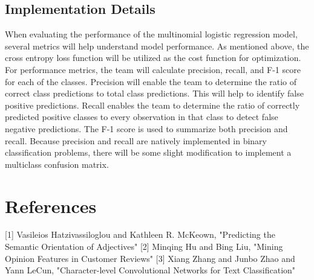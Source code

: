 \documentclass[conference]{IEEEtran}
\begin{document}
\subsection{Implementation Details}
When evaluating the performance of the multinomial logistic regression model, several metrics will help understand model performance. As mentioned above, the cross entropy loss function will be utilized as the cost function for optimization. For performance metrics, the team will calculate precision, recall, and F-1 score for each of the classes. Precision will enable the team to determine the ratio of correct class predictions to total class predictions. This will help to identify false positive predictions. Recall enables the team to determine the ratio of correctly predicted positive classes to every observation in that class to detect false negative predictions. The F-1 score is used to summarize both precision and recall. Because precision and recall are natively implemented in binary classification problems, there will be some slight modification to implement a multiclass confusion matrix. \\

\section{References}

[1] Vasileios Hatzivassiloglou and Kathleen R. McKeown, "Predicting the Semantic Orientation of Adjectives"
[2] Minqing Hu and Bing Liu, "Mining Opinion Features in Customer Reviews"
[3] Xiang Zhang and Junbo Zhao and Yann LeCun, "Character-level Convolutional Networks for Text Classification"




\end{document}
